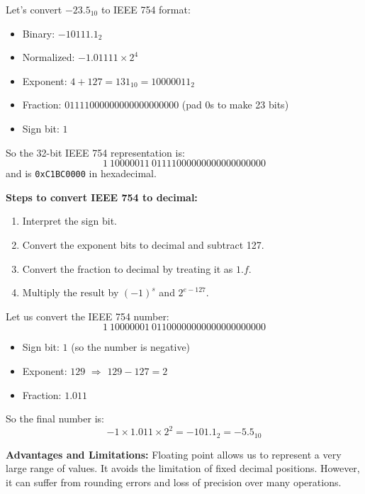 \documentclass[12pt]{book}
\begin{document}
\begin{itemize}
\begin{example}
Let’s convert $-23.5_{10}$ to IEEE 754 format:

\begin{itemize}
    \item Binary: $-10111.1_2$
    \item Normalized: $-1.01111 \times 2^4$
    \item Exponent: $4 + 127 = 131_{10} = 10000011_2$
    \item Fraction: $01111000000000000000000$ (pad 0s to make 23 bits)
    \item Sign bit: $1$
\end{itemize}

So the 32-bit IEEE 754 representation is:
\[
\boxed{1~10000011~01111000000000000000000}
\]
and is \texttt{0xC1BC0000} in hexadecimal.
\end{example}

\medskip
\textbf{Steps to convert IEEE 754 to decimal:}
\begin{enumerate}
    \item Interpret the sign bit.
    \item Convert the exponent bits to decimal and subtract 127.
    \item Convert the fraction to decimal by treating it as $1.f$.
    \item Multiply the result by $(-1)^s$ and $2^{e - 127}$.
\end{enumerate}

\begin{example}
Let us convert the IEEE 754 number:
\[
1~10000001~01100000000000000000000
\]
\begin{itemize}
    \item Sign bit: $1$ (so the number is negative)
    \item Exponent: $129$ $\Rightarrow$ $129 - 127 = 2$
    \item Fraction: $1.011$
\end{itemize}
So the final number is:
\[
-1 \times 1.011 \times 2^2 = -101.1_2 = -5.5_{10}
\]
\end{example}

\medskip
\textbf{Advantages and Limitations:} Floating point allows us to represent a very large range of values. It avoids the limitation of fixed decimal positions. However, it can suffer from rounding errors and loss of precision over many operations.


\end{itemize}
\end{document}
